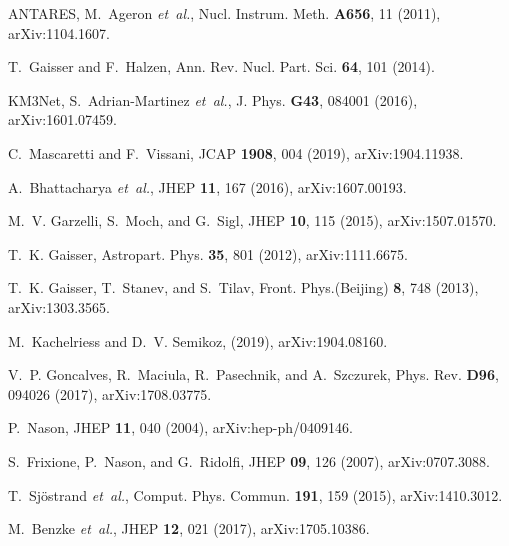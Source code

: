 \documentclass[12pt]{article}
\begin{document}
\begin{thebibliography}{99}
ANTARES, M.~Ageron {\em et~al.},
\newblock Nucl. Instrum. Meth. {\bf A656}, 11 (2011), arXiv:1104.1607.

T.~Gaisser and F.~Halzen,
\newblock Ann. Rev. Nucl. Part. Sci. {\bf 64}, 101 (2014).

KM3Net, S.~Adrian-Martinez {\em et~al.},
\newblock J. Phys. {\bf G43}, 084001 (2016), arXiv:1601.07459.

C.~Mascaretti and F.~Vissani,
\newblock JCAP {\bf 1908}, 004 (2019), arXiv:1904.11938.

A.~Bhattacharya {\em et~al.},
\newblock JHEP {\bf 11}, 167 (2016), arXiv:1607.00193.

M.~V. Garzelli, S.~Moch, and G.~Sigl,
\newblock JHEP {\bf 10}, 115 (2015), arXiv:1507.01570.

T.~K. Gaisser,
\newblock Astropart. Phys. {\bf 35}, 801 (2012), arXiv:1111.6675.

T.~K. Gaisser, T.~Stanev, and S.~Tilav,
\newblock Front. Phys.(Beijing) {\bf 8}, 748 (2013), arXiv:1303.3565.

M.~Kachelriess and D.~V. Semikoz,
\newblock (2019), arXiv:1904.08160.

V.~P. Goncalves, R.~Maciula, R.~Pasechnik, and A.~Szczurek,
\newblock Phys. Rev. {\bf D96}, 094026 (2017), arXiv:1708.03775.

P.~Nason,
\newblock JHEP {\bf 11}, 040 (2004), arXiv:hep-ph/0409146.

S.~Frixione, P.~Nason, and G.~Ridolfi,
\newblock JHEP {\bf 09}, 126 (2007), arXiv:0707.3088.

T.~Sj{\"o}strand {\em et~al.},
\newblock Comput. Phys. Commun. {\bf 191}, 159 (2015), arXiv:1410.3012.

M.~Benzke {\em et~al.},
\newblock JHEP {\bf 12}, 021 (2017), arXiv:1705.10386.


\end{thebibliography}
\end{document}
